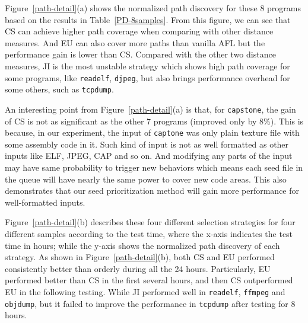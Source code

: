 Figure~\ref{path-detail}(a) shows the normalized path discovery for these 8 programs based on the results in Table~\ref{PD-8samples}. From this figure, we can see that CS can achieve higher path coverage when comparing with other distance measures. And EU can also cover more paths than vanilla AFL but the performance gain is lower than CS. Compared with the other two distance measures, JI is the most unstable strategy which shows high path coverage for some programs, like \texttt{readelf}, \texttt{djpeg}, but also brings performance overhead for some others, such as \texttt{tcpdump}.

An interesting point from Figure~\ref{path-detail}(a) is that, for \texttt{capstone}, the gain of CS is not as significant as the other 7 programs (improved only by 8\%). This is because, in our experiment, the input of \texttt{captone} was only plain texture file with some assembly code in it. Such kind of input is not as well formatted as other inputs like ELF, JPEG, CAP and so on. And modifying any parts of the input may have same probability to trigger new behaviors which means each seed file in the queue will have nearly the same power to cover new code areas. This also demonstrates that our seed prioritization method will gain more performance for well-formatted inputs.

Figure~\ref{path-detail}(b) describes these four different selection strategies for four different samples according to the test time, where the x-axis indicates the test time in hours; while the y-axis shows the normalized path discovery of each strategy.
As shown in Figure~\ref{path-detail}(b), both CS and EU performed consistently better than orderly during all the 24 hours. Particularly, EU performed better than CS in the first several hours, and then CS outperformed EU in the following testing. While JI performed well in \texttt{readelf}, \texttt{ffmpeg} and \texttt{objdump}, but it failed to improve the performance in \texttt{tcpdump} after testing for 8 hours.

